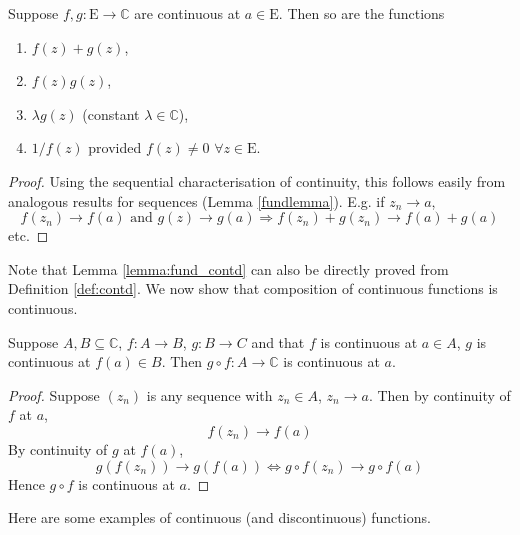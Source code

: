 \documentclass[10pt, a4paper, twoside]{report}
\begin{document}
\begin{lemma}
    Suppose \(f,g:\mathrm{E}\to\mathbb{C}\) are continuous at \(a\in\mathrm{E}\). Then so are the functions
    \begin{enumerate}
        \item \(f(z)+g(z)\),
        \item \(f(z)g(z)\),
        \item \(\lambda g(z)\) \space (constant \(\lambda\in\mathbb{C}\)),
        \item \(1/f(z)\) \space provided \(f(z)\neq 0\) \(\forall z\in\mathrm{E}\).
    \end{enumerate}
    \label{lemma:fund_contd}
\end{lemma}
\begin{proof}
    Using the sequential characterisation of continuity, this follows easily from analogous results for sequences (Lemma \ref{fundlemma}). E.g. if \(z_n\to a\),
    \[f(z_n)\to f(a)\text{  and  }g(z)\to g(a)\Rightarrow f(z_n)+g(z_n)\to f(a)+g(a)\]
    etc.
\end{proof}
Note that Lemma \ref{lemma:fund_contd} can also be directly proved from Definition \ref{def:contd}. We now show that composition of continuous functions is continuous.
\begin{theorem}
    Suppose \(A,B\subseteq\mathbb{C}\), \(f:A\to B\), \(g:B\to C\) and that \(f\) is continuous at \(a\in A\), \(g\) is continuous at \(f(a)\in B\). Then \(g\circ f:A\to\mathbb{C}\) is continuous at \(a\).
    \label{thm:comp_contd}
\end{theorem}
\begin{proof}
    Suppose \((z_n)\) is any sequence with \(z_n\in A\), \(z_n\to a\). Then by continuity of \(f\) at \(a\),
    \[f(z_n)\to f(a)\]
    By continuity of \(g\) at \(f(a)\),
    \[g(f(z_n))\to g(f(a))\Leftrightarrow g\circ f(z_n)\to g\circ f(a)\]
    Hence \(g\circ f\) is continuous at \(a\).
\end{proof}
Here are some examples of continuous (and discontinuous) functions.
\end{document}
